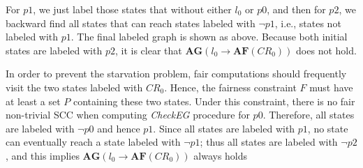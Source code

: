\documentclass[a4paper,11pt]{article}
\theoremstyle{mytheor}
\begin{document}
\begin{center}
\end{center}

For $p1$, we just label those states that without either $l_0$ or $p0$, and 
then for $p2$, we backward find all states that can reach states labeled with 
$\neg p1$, i.e., states not labeled with $p1$.
The final labeled graph is shown as above. Because both initial states are
labeled with $p2$, it is clear that $\textbf{AG}(l_0 \to \textbf{AF}(CR_0))$
does not hold.

In order to prevent the starvation problem, fair computations should frequently 
visit the two states labeled with $CR_0$. Hence, the fairness constraint $F$ 
must have at least a set $P$ containing these two states. Under this constraint,
there is no fair non-trivial SCC when computing \textit{CheckEG} procedure for 
$p0$. Therefore, all states are labeled with $\neg p0$ and hence $p1$. Since all
states are labeled with $p1$, no state can eventually reach a state labeled with
$\neg p1$; thus all states are labeled with $\neg p2$, and this implies
$\textbf{AG}(l_0 \to \textbf{AF}(CR_0))$ always holds
\end{document}
